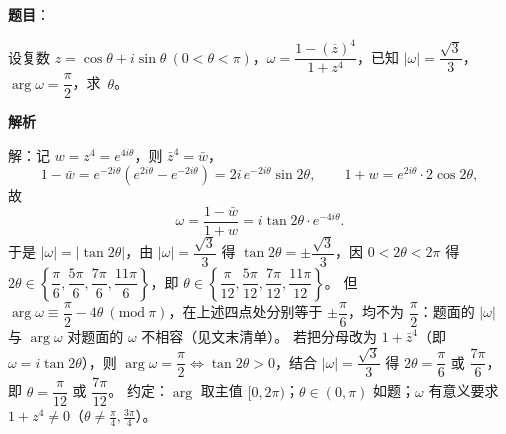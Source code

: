 \begin{answer}

\textbf{题目}：

设复数 $z=\cos\theta+i\sin\theta\ (0<\theta<\pi)$，$\omega=\dfrac{1-(\overline z)^4}{1+z^4}$，已知 $|\omega|=\dfrac{\sqrt3}{3}$，$\arg\omega=\dfrac\pi2$，\mbox{求 $\theta$。}

\textbf{解析}

解：记 $w=z^4=e^{4i\theta}$，则 $\bar z^4=\bar w$，
\nopagebreak[4]
\[1-\bar w=e^{-2i\theta}\left(e^{2i\theta}-e^{-2i\theta}\right)=2i\,e^{-2i\theta}\sin2\theta,\qquad 1+w=e^{2i\theta}\cdot2\cos2\theta,\]
故
\nopagebreak[4]
\[\omega=\frac{1-\bar w}{1+w}=i\tan2\theta\cdot e^{-4i\theta}.\]
于是 $|\omega|=|\tan2\theta|$，由 $|\omega|=\dfrac{\sqrt3}{3}$ 得 $\tan2\theta=\pm\dfrac{\sqrt3}{3}$，因 $0<2\theta<2\pi$ 得 $2\theta\in\left\{\dfrac\pi6,\dfrac{5\pi}6,\dfrac{7\pi}6,\dfrac{11\pi}6\right\}$，即 $\theta\in\left\{\dfrac\pi{12},\dfrac{5\pi}{12},\dfrac{7\pi}{12},\dfrac{11\pi}{12}\right\}$。
但 $\arg\omega\equiv\dfrac\pi2-4\theta\ (\mathrm{mod}\ \pi)$，在上述四点处分别等于 $\pm\dfrac\pi6$，均不为 $\dfrac\pi2$：题面的 $|\omega|$ 与 $\arg\omega$ 对题面的 $\omega$ 不相容（见文末清单）。
若把分母改为 $1+\bar z^4$（即 $\omega=i\tan2\theta$），则 $\arg\omega=\dfrac\pi2\iff\tan2\theta>0$，结合 $|\omega|=\dfrac{\sqrt3}3$ 得 $2\theta=\dfrac\pi6$ 或 $\dfrac{7\pi}6$，即 $\theta=\dfrac\pi{12}$ 或 $\dfrac{7\pi}{12}$。
约定：$\arg$ 取主值 $[0,2\pi)$；$\theta\in(0,\pi)$ 如题；$\omega$ 有意义要求 $1+z^4\ne0$（$\theta\ne\frac\pi4,\frac{3\pi}4$）。


\end{answer}